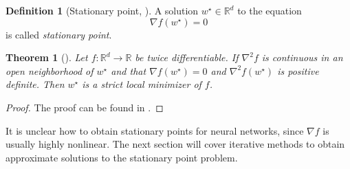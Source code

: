 \documentclass[12pt]{article}
\newtheorem{theorem}{Theorem}[section]
\theoremstyle{definition}
\newtheorem{definition}[definition]{Definition}
\numberwithin{equation}{section}
\newcommand{\R}{\mathbb{R}}
\begin{document}
\begin{definition}[Stationary point, ]
  A solution $w^\star \in \mathbb{R}^d$ to the equation
  \begin{equation}
  \label{eq:StationaryPoint}
    \nabla f(w^\star) = 0
  \end{equation}
  is called \emph{stationary point}.
\end{definition}
\begin{theorem}[]
  Let $f:\R^d \rightarrow \R$ be twice differentiable. If $\nabla^2 f$ is continuous in an open neighborhood of $w^\star$ and that $\nabla f(w^\star) = 0$ and $\nabla^2f(w^\star)$ is positive definite. Then $w^\star$ is a strict local minimizer of $f$.
\end{theorem}
\begin{proof}
  The proof can be found in \cite[pp.~16]{nocedalNumericalOptimization2006}.
\end{proof}
It is unclear how to obtain stationary points for neural networks, since $\nabla f$ is usually highly nonlinear. The next section will cover iterative methods to obtain approximate solutions to the stationary point problem.
\end{document}

